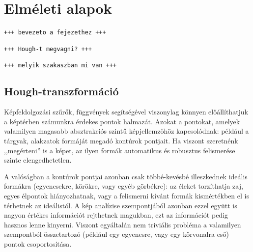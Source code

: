 \chapter{Elméleti alapok}\label{sect:elmeleti_alapok}

\texttt{+++ bevezeto a fejezethez +++}

\texttt{+++ Hough-t megvagni? +++}

\bigskip

\texttt{+++ melyik szakaszban mi van +++}

\section{Hough-transzformáció}\label{sect:hough}

Képfeldolgozási szűrők, függvények segítségével viszonylag könnyen előállíthatjuk a képtérben számunkra érdekes pontok halmazát. Azokat a pontokat, amelyek valamilyen magasabb absztrakciós szintű képjellemzőhöz kapcsolódnak: például a tárgyak, alakzatok formáját megadó kontúrok pontjait. Ha viszont szeretnénk ,,megérteni'' is a képet, az ilyen formák automatikus és robusztus felismerése szinte elengedhetetlen.

A valóságban a kontúrok pontjai azonban csak többé-kevésbé illeszkednek ideális formákra (egyenesekre, körökre, vagy egyéb görbékre): az éleket torzíthatja zaj, egyes élpontok hiányozhatnak, vagy a felismerni kívánt formák kismértékben el is térhetnek az ideálistól. A kép analízise szempontjából azonban ezzel együtt is nagyon értékes információt rejthetnek magukban, ezt az információt pedig hasznos lenne kinyerni. Viszont egyáltalán nem triviális probléma a valamilyen szempontból összetartozó (például egy egyenesre, vagy egy körvonalra eső) pontok csoportosítása.

